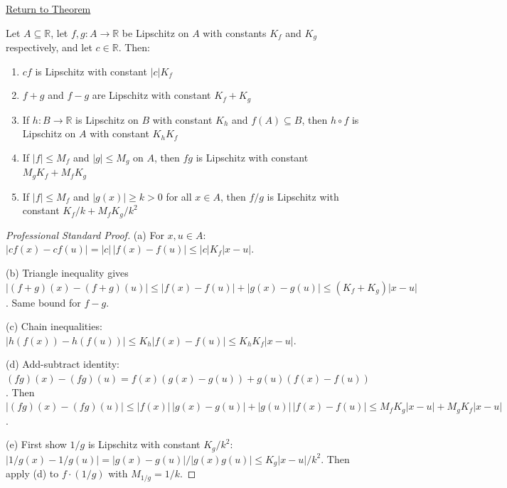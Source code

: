 \newpage
{}
\label{prf:algebra-of-lipschitz-functions}

\begin{remark*}[Return]
\hyperref[thm:algebra-of-lipschitz-functions]{Return to Theorem}
\end{remark*}

\begin{theorem*}
Let $A \subseteq \mathbb{R}$, let $f, g : A \to \mathbb{R}$ be Lipschitz on $A$ with constants $K_f$ and $K_g$ respectively, and let $c \in \mathbb{R}$. Then:
\begin{enumerate}
\item[(a)] $cf$ is Lipschitz with constant $|c|K_f$
\item[(b)] $f + g$ and $f - g$ are Lipschitz with constant $K_f + K_g$
\item[(c)] If $h : B \to \mathbb{R}$ is Lipschitz on $B$ with constant $K_h$ and $f(A) \subseteq B$, then $h \circ f$ is Lipschitz on $A$ with constant $K_h K_f$
\item[(d)] If $|f| \leq M_f$ and $|g| \leq M_g$ on $A$, then $fg$ is Lipschitz with constant $M_g K_f + M_f K_g$
\item[(e)] If $|f| \leq M_f$ and $|g(x)| \geq k > 0$ for all $x \in A$, then $f/g$ is Lipschitz with constant $K_f/k + M_f K_g/k^2$
\end{enumerate}
\end{theorem*}

\begin{proof}[Professional Standard Proof]
\LRAProofBodyStart
(a) For $x, u \in A$: $|cf(x) - cf(u)| = |c|\,|f(x) - f(u)| \leq |c| K_f |x - u|$.

(b) Triangle inequality gives $|(f + g)(x) - (f + g)(u)| \leq |f(x) - f(u)| + |g(x) - g(u)| \leq (K_f + K_g)|x - u|$. Same bound for $f - g$.

(c) Chain inequalities: $|h(f(x)) - h(f(u))| \leq K_h |f(x) - f(u)| \leq K_h K_f |x - u|$.

(d) Add-subtract identity: $(fg)(x) - (fg)(u) = f(x)(g(x) - g(u)) + g(u)(f(x) - f(u))$. Then $|(fg)(x) - (fg)(u)| \leq |f(x)|\,|g(x) - g(u)| + |g(u)|\,|f(x) - f(u)| \leq M_f K_g |x - u| + M_g K_f |x - u|$.

(e) First show $1/g$ is Lipschitz with constant $K_g/k^2$: $|1/g(x) - 1/g(u)| = |g(x) - g(u)|/|g(x)g(u)| \leq K_g|x - u|/k^2$. Then apply (d) to $f \cdot (1/g)$ with $M_{1/g} = 1/k$.
\end{proof}

